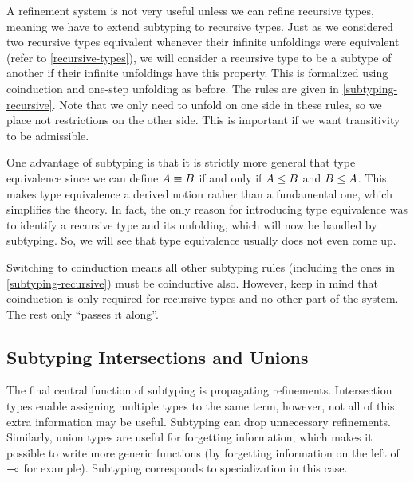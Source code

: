 A refinement system is not very useful unless we can refine recursive types, meaning we have to extend subtyping to recursive types. Just as we considered two recursive types equivalent whenever their infinite unfoldings were equivalent (refer to \cref{recursive-types}), we will consider a recursive type to be a subtype of another if their infinite unfoldings have this property. This is formalized using coinduction and one-step unfolding as before. The rules are given in \cref{subtyping-recursive}. Note that we only need to unfold on one side in these rules, so we place not restrictions on the other side. This is important if we want transitivity to be admissible.


One advantage of subtyping is that it is strictly more general that type equivalence since we can define $A \equiv B$ if and only if $A \le B$ and $B \le A$. This makes type equivalence a derived notion rather than a fundamental one, which simplifies the theory. In fact, the only reason for introducing type equivalence was to identify a recursive type and its unfolding, which will now be handled by subtyping. So, we will see that type equivalence usually does not even come up.

Switching to coinduction means all other subtyping rules (including the ones in \cref{subtyping-recursive}) must be coinductive also. However, keep in mind that coinduction is only required for recursive types and no other part of the system. The rest only ``passes it along''.


\subsection{Subtyping Intersections and Unions}

The final central function of subtyping is propagating refinements. Intersection types enable assigning multiple types to the same term, however, not all of this extra information may be useful. Subtyping can drop unnecessary refinements. Similarly, union types are useful for forgetting information, which makes it possible to write more generic functions (by forgetting information on the left of $\multimap$ for example). Subtyping corresponds to specialization in this case.

